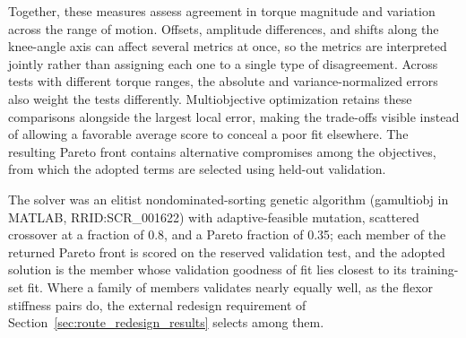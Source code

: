 \documentclass[utf8]{FrontiersinHarvard} %
\begin{document}
Together, these measures assess agreement in torque magnitude and variation across the range of motion. Offsets, amplitude differences, and shifts along the knee-angle axis can affect several metrics at once, so the metrics are interpreted jointly rather than assigning each one to a single type of disagreement. Across tests with different torque ranges, the absolute and variance-normalized errors also weight the tests differently. Multiobjective optimization retains these comparisons alongside the largest local error, making the trade-offs visible instead of allowing a favorable average score to conceal a poor fit elsewhere. The resulting Pareto front contains alternative compromises among the objectives, from which the adopted terms are selected using held-out validation.

The solver was an elitist nondominated-sorting genetic algorithm (gamultiobj in MATLAB, RRID:SCR\_001622) with adaptive-feasible mutation, scattered crossover at a fraction of 0.8, and a Pareto fraction of 0.35; each member of the returned Pareto front is scored on the reserved validation test, and the adopted solution is the member whose validation goodness of fit lies closest to its training-set fit. Where a family of members validates nearly equally well, as the flexor stiffness pairs do, the external redesign requirement of Section~\ref{sec:route_redesign_results} selects among them.
\end{document}
